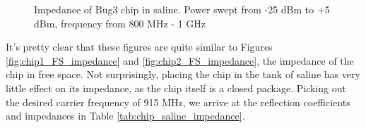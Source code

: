 \documentclass[12pt,onecolumn,titlepage]{article}
\begin{document}
\begin{figure}[htbp]
	\centering
		\quad
	\label{fig:chip_saline_impedance}
	\caption{Impedance of Bug3 chip in saline. Power swept from -25 dBm to +5 dBm, frequency from 800 MHz - 1 GHz}
\end{figure}

It's pretty clear that these figures are quite similar to Figures \ref{fig:chip1_FS_impedance} and \ref{fig:chip2_FS_impedance}, the impedance of the chip in free space. Not surprisingly, placing the chip in the tank of saline has very little effect on its impedance, as the chip itself is a closed package. Picking out the desired carrier frequency of 915 MHz, we arrive at the reflection coefficients and impedances in Table \ref{tab:chip_saline_impedance}.
\end{document}
